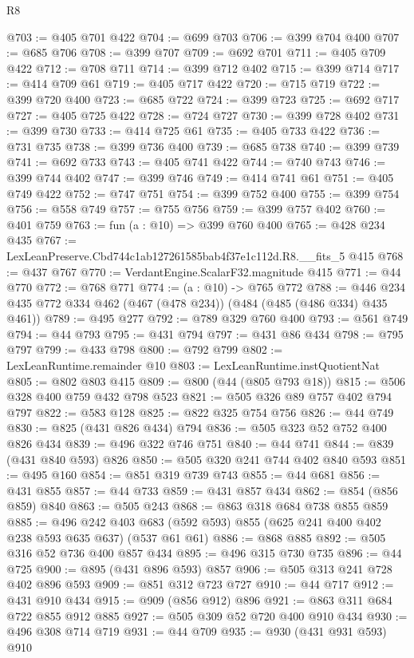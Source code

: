 \begin{lexlean}{R8}
\begin{coremodule}
@703 := @405 @701 @422
@704 := @699 @703
@706 := @399 @704 @400
@707 := @685 @706
@708 := @399 @707
@709 := @692 @701
@711 := @405 @709 @422
@712 := @708 @711
@714 := @399 @712 @402
@715 := @399 @714
@717 := @414 @709 @61
@719 := @405 @717 @422
@720 := @715 @719
@722 := @399 @720 @400
@723 := @685 @722
@724 := @399 @723
@725 := @692 @717
@727 := @405 @725 @422
@728 := @724 @727
@730 := @399 @728 @402
@731 := @399 @730
@733 := @414 @725 @61
@735 := @405 @733 @422
@736 := @731 @735
@738 := @399 @736 @400
@739 := @685 @738
@740 := @399 @739
@741 := @692 @733
@743 := @405 @741 @422
@744 := @740 @743
@746 := @399 @744 @402
@747 := @399 @746
@749 := @414 @741 @61
@751 := @405 @749 @422
@752 := @747 @751
@754 := @399 @752 @400
@755 := @399 @754
@756 := @558 @749
@757 := @755 @756
@759 := @399 @757 @402
@760 := @401 @759
@763 := fun (a : @10) => @399 @760 @400
@765 := @428 @234 @435
@767 := LexLeanPreserve.Cbd744c1ab127261585bab4f37e1c112d.R8.__fits_5 @415
@768 := @437 @767
@770 := VerdantEngine.ScalarF32.magnitude @415
@771 := @44 @770
@772 := @768 @771
@774 := (a : @10) -> @765 @772
@788 := @446 @234 @435 @772 @334 @462 (@467 (@478 @234)) (@484 (@485 (@486 @334) @435 @461))
@789 := @495 @277
@792 := @789 @329 @760 @400
@793 := @561 @749
@794 := @44 @793
@795 := @431 @794
@797 := @431 @86 @434
@798 := @795 @797
@799 := @433 @798
@800 := @792 @799
@802 := LexLeanRuntime.remainder @10
@803 := LexLeanRuntime.instQuotientNat
@805 := @802 @803 @415
@809 := @800 (@44 (@805 @793 @18))
@815 := @506 @328 @400 @759 @432 @798 @523
@821 := @505 @326 @89 @757 @402 @794 @797
@822 := @583 @128
@825 := @822 @325 @754 @756
@826 := @44 @749
@830 := @825 (@431 @826 @434) @794
@836 := @505 @323 @52 @752 @400 @826 @434
@839 := @496 @322 @746 @751
@840 := @44 @741
@844 := @839 (@431 @840 @593) @826
@850 := @505 @320 @241 @744 @402 @840 @593
@851 := @495 @160
@854 := @851 @319 @739 @743
@855 := @44 @681
@856 := @431 @855
@857 := @44 @733
@859 := @431 @857 @434
@862 := @854 (@856 @859) @840
@863 := @505 @243
@868 := @863 @318 @684 @738 @855 @859
@885 := @496
    @242
    @403
    @683
    (@592 @593)
    @855
    (@625 @241 @400 @402 @238 @593 @635 @637)
    (@537 @61 @61)
@886 := @868 @885
@892 := @505 @316 @52 @736 @400 @857 @434
@895 := @496 @315 @730 @735
@896 := @44 @725
@900 := @895 (@431 @896 @593) @857
@906 := @505 @313 @241 @728 @402 @896 @593
@909 := @851 @312 @723 @727
@910 := @44 @717
@912 := @431 @910 @434
@915 := @909 (@856 @912) @896
@921 := @863 @311 @684 @722 @855 @912 @885
@927 := @505 @309 @52 @720 @400 @910 @434
@930 := @496 @308 @714 @719
@931 := @44 @709
@935 := @930 (@431 @931 @593) @910

\end{coremodule}
\end{lexlean}
